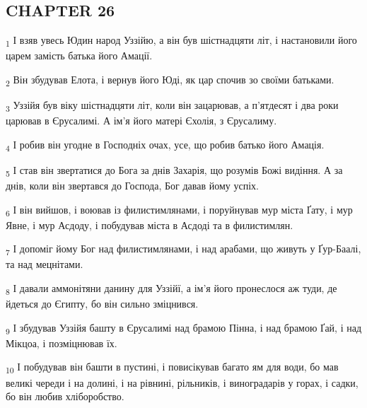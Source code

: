\subsection{CHAPTER 26}
\begin{tcolorbox}
\textsubscript{1} І взяв увесь Юдин народ Уззійю, а він був шістнадцяти літ, і настановили його царем замість батька його Амації.
\end{tcolorbox}
\begin{tcolorbox}
\textsubscript{2} Він збудував Елота, і вернув його Юді, як цар спочив зо своїми батьками.
\end{tcolorbox}
\begin{tcolorbox}
\textsubscript{3} Уззійя був віку шістнадцяти літ, коли він зацарював, а п'ятдесят і два роки царював в Єрусалимі. А ім'я його матері Єхолія, з Єрусалиму.
\end{tcolorbox}
\begin{tcolorbox}
\textsubscript{4} І робив він угодне в Господніх очах, усе, що робив батько його Амація.
\end{tcolorbox}
\begin{tcolorbox}
\textsubscript{5} І став він звертатися до Бога за днів Захарія, що розумів Божі видіння. А за днів, коли він звертався до Господа, Бог давав йому успіх.
\end{tcolorbox}
\begin{tcolorbox}
\textsubscript{6} І він вийшов, і воював із филистимлянами, і поруйнував мур міста Ґату, і мур Явне, і мур Асдоду, і побудував міста в Асдоді та в филистимлян.
\end{tcolorbox}
\begin{tcolorbox}
\textsubscript{7} І допоміг йому Бог над филистимлянами, і над арабами, що живуть у Ґур-Баалі, та над мецнітами.
\end{tcolorbox}
\begin{tcolorbox}
\textsubscript{8} І давали аммонітяни данину для Уззійї, а ім'я його пронеслося аж туди, де йдеться до Єгипту, бо він сильно зміцнився.
\end{tcolorbox}
\begin{tcolorbox}
\textsubscript{9} І збудував Уззійя башту в Єрусалимі над брамою Пінна, і над брамою Ґай, і над Мікцоа, і позміцнював їх.
\end{tcolorbox}
\begin{tcolorbox}
\textsubscript{10} І побудував він башти в пустині, і повисікував багато ям для води, бо мав великі череди і на долині, і на рівнині, рільників, і виноградарів у горах, і садки, бо він любив хліборобство.
\end{tcolorbox}
